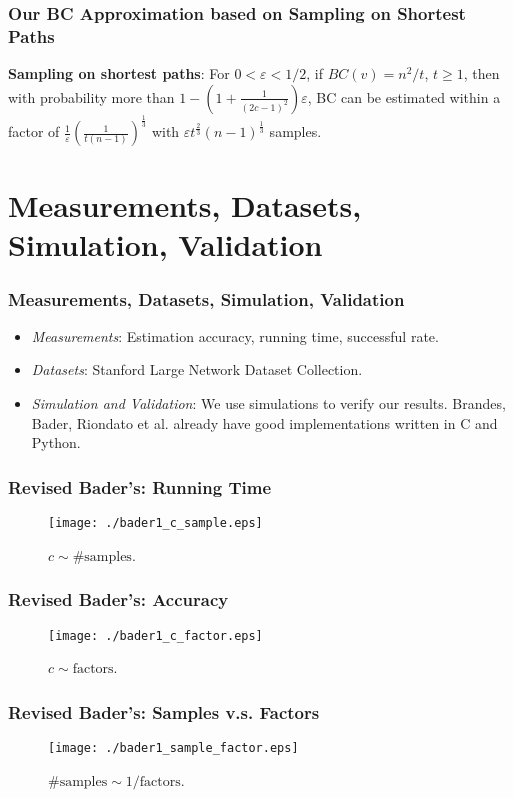 \documentclass[12pt]{beamer}
\begin{document}
\begin{frame}
	\frametitle{Our BC Approximation based on Sampling on Shortest Paths}	
	{\bf Sampling on shortest paths}: For $0<\varepsilon < 1/2$, if $BC(v) = n^2/t$, $t\geq 1$, then with probability more than $1-\left(1+\frac{1}{(2c-1)^2}\right)\varepsilon$, BC can be estimated within a factor of $\frac{1}{\varepsilon}\left(\frac{1}{t(n-1)}\right)^{\frac{1}{3}}$ with $\varepsilon t^{\frac{2}{3}}(n-1)^{\frac{1}{3}}$ samples.
\end{frame}

\section{Measurements, Datasets, Simulation, Validation}
\begin{frame}
	\frametitle{Measurements, Datasets, Simulation, Validation}
	\begin{itemize}
	\item {\it Measurements}: Estimation accuracy, running time, successful rate.
	\item {\it Datasets}: Stanford Large Network Dataset Collection.
	\item {\it Simulation and Validation}: We use simulations to verify our results. Brandes, Bader, Riondato et al. already have good implementations written in C and Python.
	\end{itemize}
\end{frame}

\begin{frame}
	\frametitle{Revised Bader's: Running Time}
	\begin{figure}
	\texttt{[image: ./bader1\_c\_sample.eps]}
\caption{$c \sim \textrm{\# samples}$.}
\end{figure}
\end{frame}

\begin{frame}
	\frametitle{Revised Bader's: Accuracy}
	\begin{figure}
	\texttt{[image: ./bader1\_c\_factor.eps]}
\caption{$c \sim \textrm{factors}$.}
\end{figure}
\end{frame}

\begin{frame}
	\frametitle{Revised Bader's: Samples v.s. Factors}
	\begin{figure}
	\texttt{[image: ./bader1\_sample\_factor.eps]}
\caption{$\textrm{\# samples} \sim 1/\textrm{factors}$.}
\end{figure}
\end{frame}
\end{document}
